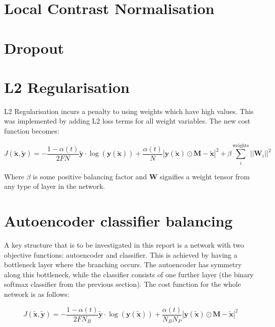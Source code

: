   \section{Local Contrast Normalisation}
  \section{Dropout}
  \section{L2 Regularisation}
    L2 Regularisation incurs a penalty to using weights which have high values. This was implemented by adding L2
    loss terms for all weight variables. The new cost function becomes:

    \begin{equation} \label{eq:l2_cost_model}
        J(\tilde{\mathbf{x}},\tilde{\mathbf{y}}) = -\frac{1-\alpha(t)}{2FN}\tilde{\mathbf{y}}\cdot\log(\mathbf{y}(\tilde{\mathbf{x}}))
        + \frac{\alpha(t)}{N}\left |\mathbf{y}(\tilde{\mathbf{x}}) \odot \mathbf{M}-\tilde{\mathbf{x}}\right | ^2
        + \beta \sum_i^{\text{weights}}||\mathbf{W}_i||^2
    \end{equation}

    Where $\beta$ is some positive balancing factor and $\mathbf{W}$ signifies
    a weight tensor from any type of layer in the network.



  \section{Autoencoder classifier balancing}
    \label{sec:autoalpha}
    A key structure that is to be investigated in this report is a network with two objective functions:
    autoencoder and classifier. This is achieved by having a bottleneck layer where the branching occurs.
    The autoencoder has symmetry along this bottleneck, while the classifier consists of one further layer
    (the binary softmax classifier from the previous section). The cost function for the whole network is as follows:

    \begin{equation}
      J(\tilde{\mathbf{x}},\tilde{\mathbf{y}}) = -\frac{1-\alpha(t)}{2FN_B}\tilde{\mathbf{y}}\cdot\log(\mathbf{y}(\tilde{\mathbf{x}}))
      + \frac{\alpha(t)}{N_BN_P}\left |\mathbf{y}(\tilde{\mathbf{x}}) \odot \mathbf{M}-\tilde{\mathbf{x}}\right | ^2
    \end{equation}

